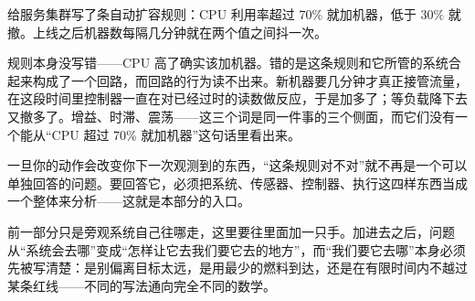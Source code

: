 给服务集群写了条自动扩容规则：CPU 利用率超过 \(70\%\) 就加机器，低于 \(30\%\) 就撤。上线之后机器数每隔几分钟就在两个值之间抖一次。

规则本身没写错——CPU 高了确实该加机器。错的是这条规则和它所管的系统合起来构成了一个回路，而回路的行为读不出来。新机器要几分钟才真正接管流量，在这段时间里控制器一直在对已经过时的读数做反应，于是加多了；等负载降下去又撤多了。增益、时滞、震荡——这三个词是同一件事的三个侧面，而它们没有一个能从``CPU 超过 70\% 就加机器''这句话里看出来。

一旦你的动作会改变你下一次观测到的东西，``这条规则对不对''就不再是一个可以单独回答的问题。要回答它，必须把系统、传感器、控制器、执行这四样东西当成一个整体来分析——这就是本部分的入口。

前一部分只是旁观系统自己往哪走，这里要往里面加一只手。加进去之后，问题从``系统会去哪''变成``怎样让它去我们要它去的地方''，而``我们要它去哪''本身必须先被写清楚：是别偏离目标太远，是用最少的燃料到达，还是在有限时间内不越过某条红线——不同的写法通向完全不同的数学。

